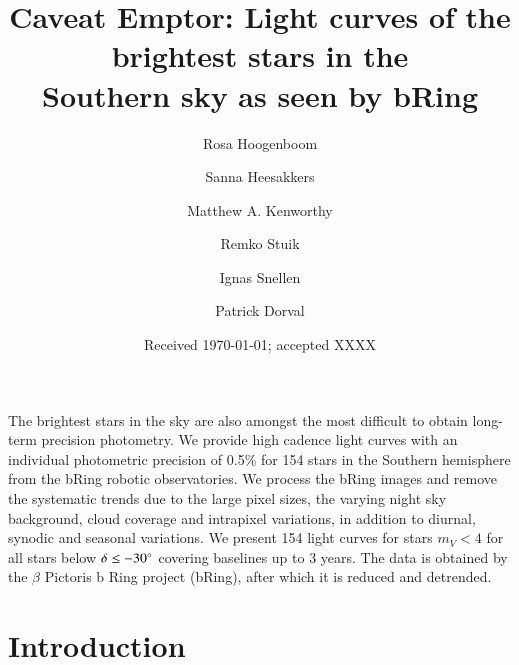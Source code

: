 \documentclass{aa}
\begin{document}
 

   \title{Caveat Emptor: Light curves of the brightest stars in the \\ Southern sky as seen by bRing}

   \author{Rosa Hoogenboom
          \and
          Sanna Heesakkers
          \and
          Matthew A. Kenworthy
          \and
          Remko Stuik
          \and
          Ignas Snellen
          \and
          Patrick Dorval
          }


   \date{Received \today; accepted XXXX}

 
  \abstract
   {The brightest stars in the sky are also amongst the most difficult to obtain long-term precision photometry. }
   {We provide high cadence light curves with an individual photometric precision of 0.5\% for 154 stars in the Southern hemisphere from the bRing robotic observatories.}
   {We process the bRing images and remove the systematic trends due to the large pixel sizes, the varying night sky background, cloud coverage and intrapixel variations, in addition to diurnal, synodic and seasonal variations.}
   {We present 154 light curves for stars $m_V<4$ for all stars below $\delta \leq -30^\circ $ covering baselines up to 3 years. The data is obtained by the $\beta$ Pictoris b Ring project (bRing), after which it is reduced and detrended.}
   {}


   \maketitle
%

\section{Introduction}
\end{document}
